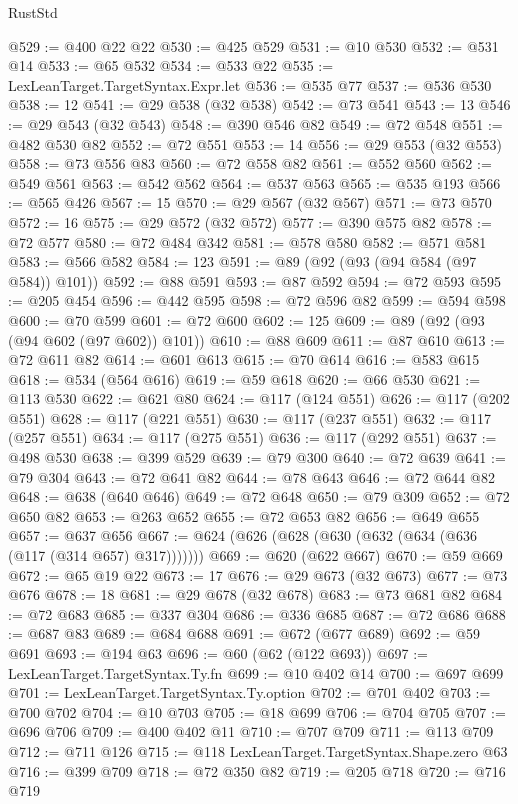 \begin{lexlean}{RustStd}
\begin{coremodule}
@529 := @400 @22 @22
@530 := @425 @529
@531 := @10 @530
@532 := @531 @14
@533 := @65 @532
@534 := @533 @22
@535 := LexLeanTarget.TargetSyntax.Expr.let
@536 := @535 @77
@537 := @536 @530
@538 := 12
@541 := @29 @538 (@32 @538)
@542 := @73 @541
@543 := 13
@546 := @29 @543 (@32 @543)
@548 := @390 @546 @82
@549 := @72 @548
@551 := @482 @530 @82
@552 := @72 @551
@553 := 14
@556 := @29 @553 (@32 @553)
@558 := @73 @556 @83
@560 := @72 @558 @82
@561 := @552 @560
@562 := @549 @561
@563 := @542 @562
@564 := @537 @563
@565 := @535 @193
@566 := @565 @426
@567 := 15
@570 := @29 @567 (@32 @567)
@571 := @73 @570
@572 := 16
@575 := @29 @572 (@32 @572)
@577 := @390 @575 @82
@578 := @72 @577
@580 := @72 @484 @342
@581 := @578 @580
@582 := @571 @581
@583 := @566 @582
@584 := 123
@591 := @89 (@92 (@93 (@94 @584 (@97 @584)) @101))
@592 := @88 @591
@593 := @87 @592
@594 := @72 @593
@595 := @205 @454
@596 := @442 @595
@598 := @72 @596 @82
@599 := @594 @598
@600 := @70 @599
@601 := @72 @600
@602 := 125
@609 := @89 (@92 (@93 (@94 @602 (@97 @602)) @101))
@610 := @88 @609
@611 := @87 @610
@613 := @72 @611 @82
@614 := @601 @613
@615 := @70 @614
@616 := @583 @615
@618 := @534 (@564 @616)
@619 := @59 @618
@620 := @66 @530
@621 := @113 @530
@622 := @621 @80
@624 := @117 (@124 @551)
@626 := @117 (@202 @551)
@628 := @117 (@221 @551)
@630 := @117 (@237 @551)
@632 := @117 (@257 @551)
@634 := @117 (@275 @551)
@636 := @117 (@292 @551)
@637 := @498 @530
@638 := @399 @529
@639 := @79 @300
@640 := @72 @639
@641 := @79 @304
@643 := @72 @641 @82
@644 := @78 @643
@646 := @72 @644 @82
@648 := @638 (@640 @646)
@649 := @72 @648
@650 := @79 @309
@652 := @72 @650 @82
@653 := @263 @652
@655 := @72 @653 @82
@656 := @649 @655
@657 := @637 @656
@667 := @624 (@626 (@628 (@630 (@632 (@634 (@636 (@117 (@314 @657) @317)))))))
@669 := @620 (@622 @667)
@670 := @59 @669
@672 := @65 @19 @22
@673 := 17
@676 := @29 @673 (@32 @673)
@677 := @73 @676
@678 := 18
@681 := @29 @678 (@32 @678)
@683 := @73 @681 @82
@684 := @72 @683
@685 := @337 @304
@686 := @336 @685
@687 := @72 @686
@688 := @687 @83
@689 := @684 @688
@691 := @672 (@677 @689)
@692 := @59 @691
@693 := @194 @63
@696 := @60 (@62 (@122 @693))
@697 := LexLeanTarget.TargetSyntax.Ty.fn
@699 := @10 @402 @14
@700 := @697 @699
@701 := LexLeanTarget.TargetSyntax.Ty.option
@702 := @701 @402
@703 := @700 @702
@704 := @10 @703
@705 := @18 @699
@706 := @704 @705
@707 := @696 @706
@709 := @400 @402 @11
@710 := @707 @709
@711 := @113 @709
@712 := @711 @126
@715 := @118 LexLeanTarget.TargetSyntax.Shape.zero @63
@716 := @399 @709
@718 := @72 @350 @82
@719 := @205 @718
@720 := @716 @719

\end{coremodule}
\end{lexlean}
